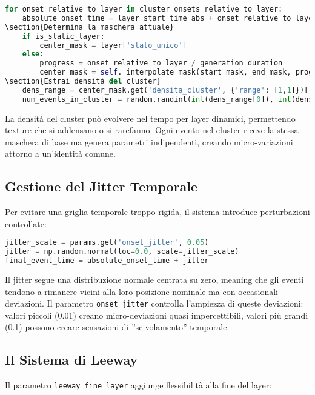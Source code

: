 \begin{lstlisting}[language=Python]
for onset_relative_to_layer in cluster_onsets_relative_to_layer:
    absolute_onset_time = layer_start_time_abs + onset_relative_to_layer
\section{Determina la maschera attuale}
    if is_static_layer:
        center_mask = layer['stato_unico']
    else:
        progress = onset_relative_to_layer / generation_duration
        center_mask = self._interpolate_mask(start_mask, end_mask, progress)
\section{Estrai densità del cluster}
    dens_range = center_mask.get('densita_cluster', {'range': [1,1]})['range']
    num_events_in_cluster = random.randint(int(dens_range[0]), int(dens_range[1]))
\end{lstlisting}

La densità del cluster può evolvere nel tempo per layer dinamici, permettendo texture che si addensano o si rarefanno. Ogni evento nel cluster riceve la stessa maschera di base ma genera parametri indipendenti, creando micro-variazioni attorno a un'identità comune.
\subsection{Gestione del Jitter Temporale}
Per evitare una griglia temporale troppo rigida, il sistema introduce perturbazioni controllate:

\begin{lstlisting}[language=Python]
jitter_scale = params.get('onset_jitter', 0.05)
jitter = np.random.normal(loc=0.0, scale=jitter_scale)
final_event_time = absolute_onset_time + jitter
\end{lstlisting}

Il jitter segue una distribuzione normale centrata su zero, meaning che gli eventi tendono a rimanere vicini alla loro posizione nominale ma con occasionali deviazioni. Il parametro \texttt{onset\_jitter} controlla l'ampiezza di queste deviazioni: valori piccoli (0.01) creano micro-deviazioni quasi impercettibili, valori più grandi (0.1) possono creare sensazioni di ''scivolamento'' temporale.
\subsection{Il Sistema di Leeway}
Il parametro \texttt{leeway\_fine\_layer} aggiunge flessibilità alla fine del layer:

